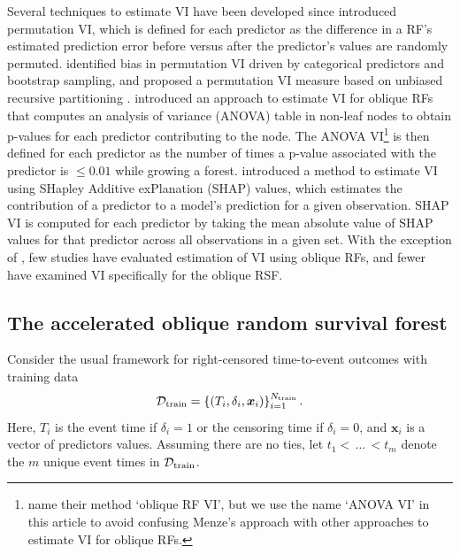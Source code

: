 \documentclass[12pt]{article}\usepackage[]{graphicx}\usepackage[]{xcolor}
\newcommand{\dataset}{{\cal D}}
\begin{document}
Several techniques to estimate VI have been developed since \citet{breiman2001random} introduced permutation VI, which is defined for each predictor as the difference in a RF's estimated prediction error before versus after the predictor's values are randomly permuted. \citet{strobl2007bias} identified bias in permutation VI driven by categorical predictors and bootstrap sampling, and proposed a permutation VI measure based on unbiased recursive partitioning \citep{hothorn2006unbiased}. \citet{menze2011oblique} introduced an approach to estimate VI for oblique RFs that computes an analysis of variance (ANOVA) table in non-leaf nodes to obtain p-values for each predictor contributing to the node. The ANOVA VI\footnote{\citet{menze2011oblique} name their method `oblique RF VI', but we use the name `ANOVA VI' in this article to avoid confusing Menze's approach with other approaches to estimate VI for oblique RFs.} is then defined for each predictor as the number of times a p-value associated with the predictor is $\leq 0.01$ while growing a forest. \citet{lundberg2017unified} introduced a method to estimate VI using SHapley Additive exPlanation (SHAP) values, which estimates the contribution of a predictor to a model's prediction for a given observation. SHAP VI is computed for each predictor by taking the mean absolute value of SHAP values for that predictor across all observations in a given set. With the exception of \citet{menze2011oblique}, few studies have evaluated estimation of VI using oblique RFs, and fewer have examined VI specifically for the oblique RSF.


\subsection{The accelerated oblique random survival forest} \label{sec:aorsf}

Consider the usual framework for right-censored time-to-event outcomes with training data $$\dataset_{\text{train}} = \left\{ (T_i, \delta_i, \bm{x}_{i}) \right\}_{i=1}^{N_{\text{train}}}.$$ Here, $T_i$ is the event time if $\delta_i=1$ or the censoring time if $\delta_i=0$, and $\bm{x}_i$ is a vector of predictors values. Assuming there are no ties, let $t_1 < \, \ldots \, < t_m$ denote the $m$ unique event times in $\dataset_{\text{train}}$.
\end{document}
